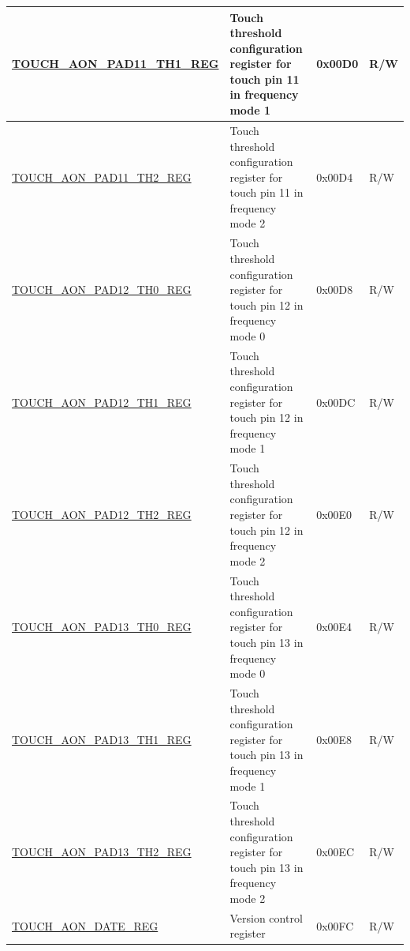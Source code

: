 \begin{longtable}{ | p{8cm} | p{12.5cm} | p{1.3cm} | p{1cm} | }
\hyperref[regdesc:TOUCHAONPADNTH1REG]{TOUCH\_AON\_PAD11\_TH1\_REG} & Touch threshold configuration register for touch pin 11 in frequency mode 1 & 0x00D0 & R/W \\ \hline
\hyperref[regdesc:TOUCHAONPADNTH2REG]{TOUCH\_AON\_PAD11\_TH2\_REG} & Touch threshold configuration register for touch pin 11 in frequency mode 2 & 0x00D4 & R/W \\ \hline
\hyperref[regdesc:TOUCHAONPADNTH0REG]{TOUCH\_AON\_PAD12\_TH0\_REG} & Touch threshold configuration register for touch pin 12 in frequency mode 0  & 0x00D8 & R/W \\ \hline
\hyperref[regdesc:TOUCHAONPADNTH1REG]{TOUCH\_AON\_PAD12\_TH1\_REG} & Touch threshold configuration register for touch pin 12 in frequency mode 1  & 0x00DC & R/W \\ \hline
\hyperref[regdesc:TOUCHAONPADNTH2REG]{TOUCH\_AON\_PAD12\_TH2\_REG} & Touch threshold configuration register for touch pin 12 in frequency mode 2 & 0x00E0 & R/W \\ \hline
\hyperref[regdesc:TOUCHAONPADNTH0REG]{TOUCH\_AON\_PAD13\_TH0\_REG} & Touch threshold configuration register for touch pin 13 in frequency mode 0 & 0x00E4 & R/W \\ \hline
\hyperref[regdesc:TOUCHAONPADNTH1REG]{TOUCH\_AON\_PAD13\_TH1\_REG} & Touch threshold configuration register for touch pin 13 in frequency mode 1 & 0x00E8 & R/W \\ \hline
\hyperref[regdesc:TOUCHAONPADNTH2REG]{TOUCH\_AON\_PAD13\_TH2\_REG} & Touch threshold configuration register for touch pin 13 in frequency mode 2 & 0x00EC & R/W \\ \hline
\hyperref[regdesc:TOUCHAONDATEREG]{TOUCH\_AON\_DATE\_REG} & Version control register & 0x00FC & R/W \\ \hline
\end{longtable}
